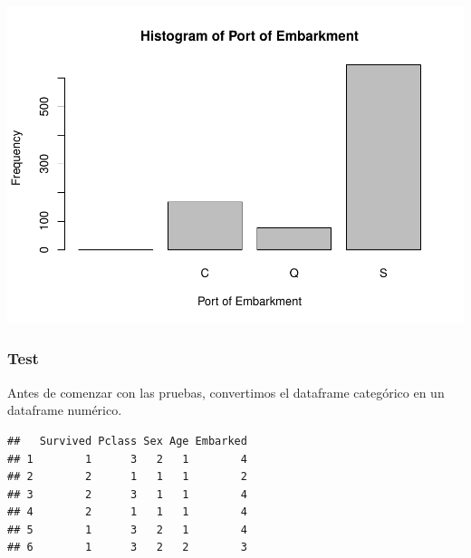 \documentclass[]{article}
\newenvironment{Shaded}{\begin{snugshade}}{\end{snugshade}}
\newcommand{\KeywordTok}[1]{\textcolor[rgb]{0.13,0.29,0.53}{\textbf{#1}}}
\newcommand{\StringTok}[1]{\textcolor[rgb]{0.31,0.60,0.02}{#1}}
\newcommand{\OperatorTok}[1]{\textcolor[rgb]{0.81,0.36,0.00}{\textbf{#1}}}
\newcommand{\NormalTok}[1]{#1}
\begin{document}
\includegraphics{titanicDataClean_files/figure-latex/unnamed-chunk-11-4.pdf}

\subsubsection{Test}\label{test}

Antes de comenzar con las pruebas, convertimos el dataframe categórico
en un dataframe numérico.

\begin{Shaded}
\end{Shaded}

\begin{verbatim}
##   Survived Pclass Sex Age Embarked
## 1        1      3   2   1        4
## 2        2      1   1   1        2
## 3        2      3   1   1        4
## 4        2      1   1   1        4
## 5        1      3   2   1        4
## 6        1      3   2   2        3
\end{verbatim}
\end{document}
